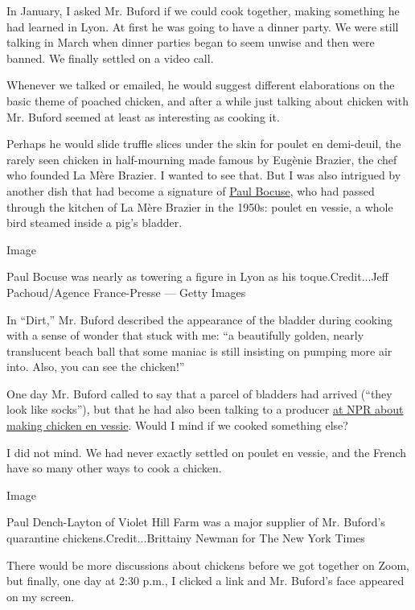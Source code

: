 In January, I asked Mr. Buford if we could cook together, making
something he had learned in Lyon. At first he was going to have a dinner
party. We were still talking in March when dinner parties began to seem
unwise and then were banned. We finally settled on a video call.

Whenever we talked or emailed, he would suggest different elaborations
on the basic theme of poached chicken, and after a while just talking
about chicken with Mr. Buford seemed at least as interesting as cooking
it.

Perhaps he would slide truffle slices under the skin for poulet en
demi-deuil, the rarely seen chicken in half-mourning made famous by
Eugènie Brazier, the chef who founded La Mère Brazier. I wanted to see
that. But I was also intrigued by another dish that had become a
signature of
\href{https://www.nytimes3xbfgragh.onion/2018/01/20/obituaries/paul-bocuse-dead.html?searchResultPosition=1}{Paul
Bocuse}, who had passed through the kitchen of La Mère Brazier in the
1950s: poulet en vessie, a whole bird steamed inside a pig's bladder.

Image

Paul Bocuse was nearly as towering a figure in Lyon as his
toque.Credit...Jeff Pachoud/Agence France-Presse --- Getty Images

In ``Dirt,'' Mr. Buford described the appearance of the bladder during
cooking with a sense of wonder that stuck with me: ``a beautifully
golden, nearly translucent beach ball that some maniac is still
insisting on pumping more air into. Also, you can see the chicken!''

One day Mr. Buford called to say that a parcel of bladders had arrived
(``they look like socks''), but that he had also been talking to a
producer
\href{https://www.npr.org/2020/05/08/852496954/in-dirt-bill-buford-is-able-to-offer-an-authentic-adventure-in-french-cooking}{at
NPR about making chicken en vessie}. Would I mind if we cooked something
else?

I did not mind. We had never exactly settled on poulet en vessie, and
the French have so many other ways to cook a chicken.

Image

Paul Dench-Layton of Violet Hill Farm was a major supplier of Mr.
Buford's quarantine chickens.Credit...Brittainy Newman for The New York
Times

There would be more discussions about chickens before we got together on
Zoom, but finally, one day at 2:30 p.m., I clicked a link and Mr.
Buford's face appeared on my screen.

